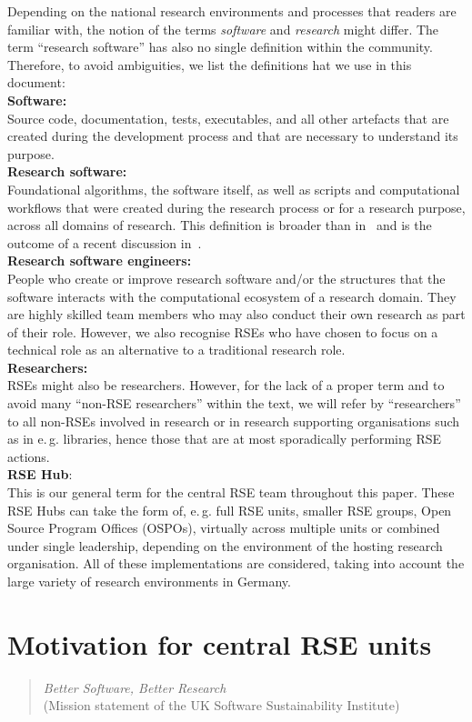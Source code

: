 \documentclass[a4paper]{article}
\makeatletter
\newcommand*{\eg}{e.\,g.\@\xspace}
\makeatother
\begin{document}
Depending on the national research environments and processes that readers are familiar with, the notion of the terms \emph{software} and \emph{research} might differ.
The term “research software” has also no single definition within the community.
Therefore, to avoid ambiguities, we list the definitions hat we use in this document:\\
\textbf{Software:}\\
Source code, documentation, tests, executables, and all other artefacts that are created during the development process and that are necessary to understand its purpose.\\
\textbf{Research software:}\\
Foundational algorithms, the software itself, as well as scripts and computational workflows that were created
during the research process or for a research purpose, across all domains of research.
This definition is broader than in~\autocite{FAIR4RS} and is the outcome of a recent discussion in~\autocite{Gruenpeter2021}.\\
\textbf{Research software engineers:}\\
People who create or improve research software and/or the structures that the software interacts with the computational ecosystem of a research domain.
They are highly skilled team members who may also conduct their own research as part of their role.
However, we also recognise RSEs who have chosen to focus on a technical role as an alternative to a traditional research role.\\
\textbf{Researchers:}\\
RSEs might also be researchers.
However, for the lack of a proper term and to avoid many “non-RSE researchers” within the text, we will refer by “researchers” to all non-RSEs involved in research or in research supporting organisations such as in \eg{} libraries, hence those that are at most sporadically performing RSE actions.\\
\textbf{RSE Hub}:\\
This is our general term for the central RSE team throughout this paper.
These RSE Hubs can take the form of, \eg{} full RSE units, smaller RSE groups, Open Source Program Offices (OSPOs), virtually across multiple units or combined under single leadership,
 depending on the environment of the hosting research organisation.
All of these implementations are considered, taking into account the large variety of research environments in Germany.

\section{Motivation for central RSE units}
\begin{quotation}
      \textit{Better Software, Better Research}\\(Mission statement of the UK Software Sustainability Institute)
\end{quotation}
\end{document}
